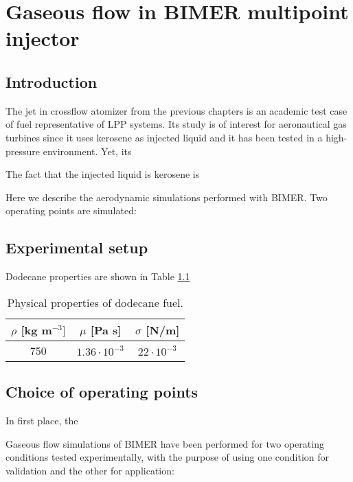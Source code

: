 \chapter{Gaseous flow in BIMER multipoint injector}
	\label{ch:bimer_test_bench}

\section{Introduction}

The jet in crossflow atomizer from the previous chapters is an academic test case of fuel representative of LPP systems. Its study is of interest for aeronautical gas turbines since it uses kerosene as injected liquid and it has been tested in a high-pressure environment. Yet, its

The fact that the injected liquid is kerosene is 

Here we describe the aerodynamic simulations performed with BIMER. Two operating points are simulated:



\section{Experimental setup}

Dodecane properties are shown in Table \ref{tab:dodecane_properties}

\begin{table}[!h]
\centering
\caption{Physical properties of dodecane fuel.}
\begin{tabular}{|c|c|c|}
\hline
$\rho$ [kg m$^{-3}]$   & $\mu$ [Pa s]   & $\sigma$ [N/m]  \\
\hline
750 & $1.36 \cdot 10^{-3}$ & $22 \cdot 10^{-3}$ \\
\hline
\end{tabular}
\label{tab:dodecane_properties}
\end{table}


\section{Choice of operating points}

In first place, the 

Gaseous flow simulations of BIMER have been performed for two operating conditions tested experimentally, with the purpose of using one condition for validation and the other for application:

